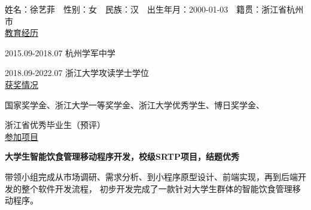 \cleardoublepage
{}
姓名：徐艺菲$\quad$性别：女$\quad$民族：汉$\quad$出生年月：2000-01-03$\quad$籍贯：浙江省杭州市 \\
\underline{教育经历}

2015.09-2018.07  杭州学军中学

2018.09-2022.07  浙江大学攻读学士学位\\
\underline{获奖情况}

国家奖学金、浙江大学一等奖学金、浙江大学优秀学生、博日奖学金、

浙江省优秀毕业生（预评）\\
\underline{参加项目}

\textbf{大学生智能饮食管理移动程序开发，校级SRTP项目，结题优秀}

带领小组完成从市场调研、需求分析、到小程序原型设计、前端实现，再到后端开发的整个软件开发流程，
初步开发完成了一款针对大学生群体的智能饮食管理移动程序。